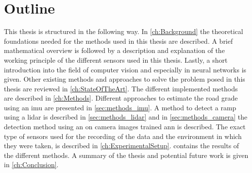 \section{Outline}
This thesis is structured in the following way.
In \cref{ch:Background} the theoretical foundations needed for the methods used in this thesis are described.
A brief mathematical overview is followed by a description and explanation of the working principle of the different sensors used in this thesis.
Lastly, a short introduction into the field of computer vision and especially in neural networks is given.
Other existing methods and approaches to solve the problem posed in this thesis are reviewed in \cref{ch:StateOfTheArt}.
The different implemented methods are described in \cref{ch:Methods}.
Different approaches to estimate the road grade using an \gls{imu} are presented in \cref{sec:methods_imu}.
A method to detect a ramp using a \gls{lidar} is described in \cref{sec:methods_lidar} and in \cref{sec:methods_camera} the detection method using an on camera images trained \gls{ann} is described.
The exact type of sensors used for the recording of the data and the environment in which they were taken, is described in \cref{ch:ExperimentalSetup}.
 contains the results of the different methods.
A summary of the thesis and potential future work is given in \cref{ch:Conclusion}.